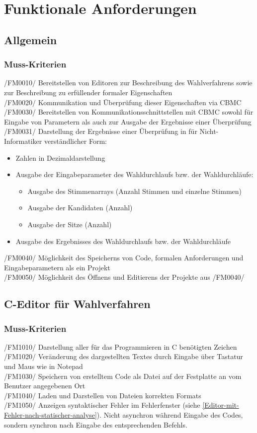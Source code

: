 \documentclass[a4paper]{scrreprt}
\begin{document}
\chapter{Funktionale Anforderungen}
\section{Allgemein}
\subsection{Muss-Kriterien}
/FM0010/ Bereitstellen von Editoren zur Beschreibung des Wahlverfahrens sowie zur Beschreibung zu erfüllender formaler Eigenschaften \\
/FM0020/ Kommunikation und Überprüfung dieser Eigenschaften via \ac{CBMC} \\
/FM0030/ Bereitstellen von Kommunikationsschnittstellen mit \ac{CBMC} sowohl für Eingabe von Parametern als auch zur Ausgabe der Ergebnisse einer Überprüfung \\
/FM0031/ Darstellung der Ergebnisse einer Überprüfung in für Nicht-Informatiker verständlicher Form:
\begin{itemize}
\item Zahlen in Dezimaldarstellung
\item Ausgabe der Eingabeparameter des Wahldurchlaufs bzw. der Wahldurchläufe:
\begin{itemize}
\item Ausgabe des Stimmenarrays (Anzahl Stimmen und einzelne Stimmen) 
\item Ausgabe der Kandidaten (Anzahl)
\item Ausgabe der Sitze (Anzahl)
\end{itemize}
\item Ausgabe des Ergebnisses des Wahldurchlaufs bzw. der Wahldurchläufe
\end{itemize} 
/FM0040/ Möglichkeit des Speicherns von Code, formalen Anforderungen und Eingabeparametern als ein Projekt \\
/FM0050/ Möglichkeit des Öffnens und Editierens der Projekte aus /FM0040/


\section{C-Editor für Wahlverfahren}
\subsection{Muss-Kriterien}
/FM1010/ Darstellung aller für das Programmieren in C benötigten Zeichen \\
/FM1020/ Veränderung des dargestellten Textes durch Eingabe über Tastatur und Maus wie in Notepad \\
/FM1030/ Speichern von erstelltem Code als Datei auf der Festplatte an vom \gls{Benutzer} angegebenen Ort \\
/FM1040/ Laden und Darstellen von Dateien korrekten Formats \\
/FM1050/ Anzeigen syntaktischer Fehler im Fehlerfenster (siehe \ref{Editor-mit-Fehler-nach-statischer-analyse}). Nicht asynchron während Eingabe des Codes, sondern synchron nach Eingabe des entsprechenden Befehls.
\end{document}
